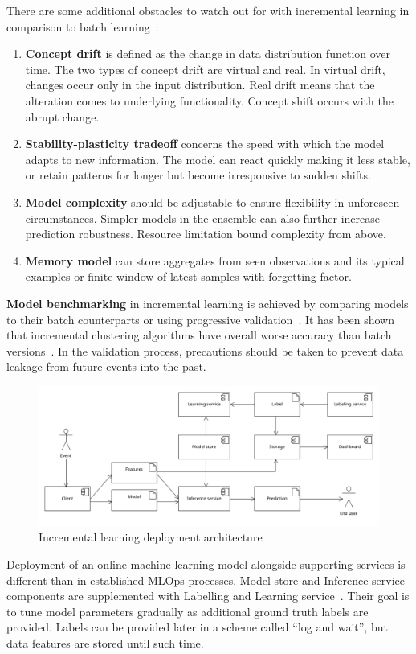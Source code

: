 There are some additional obstacles to watch out for with incremental learning in comparison to batch learning~\cite{gepperth_incremental_2016}:
\begin{enumerate}
    \itemsep0pt
    \item \textbf{Concept drift} is defined as the change in data distribution function over time. The two types of concept drift are virtual and real. In virtual drift, changes occur only in the input distribution. Real drift means that the alteration comes to underlying functionality. Concept shift occurs with the abrupt change.
    \item \textbf{Stability-plasticity tradeoff} concerns the speed with which the model adapts to new information. The model can react quickly making it less stable, or retain patterns for longer but become irresponsive to sudden shifts.
    \item \textbf{Model complexity} should be adjustable to ensure flexibility in unforeseen circumstances. Simpler models in the ensemble can also further increase prediction robustness. Resource limitation bound complexity from above.
    \item \textbf{Memory model} can store aggregates from seen observations and its typical examples or finite window of latest samples with forgetting factor.
\end{enumerate}

\textbf{Model benchmarking} in incremental learning is achieved by comparing models to their batch counterparts or using progressive validation~\cite{blum_beating_1999, halford_correct_2020}. It has been shown that incremental clustering algorithms have overall worse accuracy than batch versions~\cite{gepperth_incremental_2016}. In the validation process, precautions should be taken to prevent data leakage from future events into the past.

\begin{figure}[ht]
    \centering
    \includegraphics[width=\textwidth]{assets/analysis/incremental-learning.png}
    \caption{Incremental learning deployment architecture~\cite{gaia_online_2022}}
    \label{fig:online-learn-arch}
\end{figure} 

Deployment of an online machine learning model alongside supporting services is different than in established MLOps processes. Model store and Inference service components are supplemented with Labelling and Learning service~\cite{gaia_online_2022}. Their goal is to tune model parameters gradually as additional ground truth labels are provided. Labels can be provided later in a scheme called ``log and wait'', but data features are stored until such time.   
